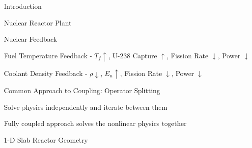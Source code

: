 \documentclass{beamer}
\begin{document}
\begin{section}{Introduction}
\begin{comment}
\end{frame}
\end{comment}
\begin{frame}{Nuclear Reactor Plant}
  \scalebox{0.45}{}
  \vfill
\end{frame}
\begin{frame}{Nuclear Feedback}
  \begin{center}
    \scalebox{0.4}{}
    \begin{itemize}
      \begin{scriptsize}
	\item Fuel Temperature Feedback -  $T_{f} \uparrow$, U-238 
	      Capture $\uparrow$, Fission Rate $\downarrow$, 
	      Power $\downarrow$
	\item \alert{Coolant Density Feedback - $\rho \downarrow$,
	      $E_{n} \uparrow$, Fission Rate $\downarrow$, 
	      Power $\downarrow$}
      \end{scriptsize}
    \end{itemize}
  \end{center}
\end{frame}
\begin{frame}{Common Approach to Coupling: Operator Splitting}
\begin{customlist}{2ex}{0pt}
  \item Solve physics independently and iterate between them
  \begin{center}
    \scalebox{0.6}{}
  \end{center}
  \item Fully coupled approach solves the nonlinear physics together
  \begin{center}
    \scalebox{0.6}{}
  \end{center}
\end{customlist}
\end{frame}
\begin{frame}{1-D Slab Reactor Geometry}
\begin{columns}
  \begin{column}{0.5\textwidth}
  \begin{center}
    \scalebox{0.5}{}

\end{center}
\end{column}
\end{columns}
\end{frame}
\end{section}
\end{document}
